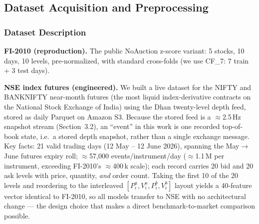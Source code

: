 \documentclass[11pt]{article}
\begin{document}
\subsection{Dataset Acquisition and Preprocessing}

\subsubsection{Dataset Description}
\textbf{FI-2010 (reproduction).} The public NoAuction z-score variant: 5 stocks, 10 days, 10 levels,
pre-normalized, with standard cross-folds (we use CF\_7: 7 train + 3 test days).

\textbf{NSE index futures (engineered).} We built a live dataset for the NIFTY and BANKNIFTY near-month
futures (the most liquid index-derivative contracts on the National Stock Exchange of India) using the Dhan
twenty-level depth feed, stored as daily Parquet on Amazon S3. Because the stored feed is a $\approx$2.5\,Hz
snapshot stream (Section~3.2), an ``event'' in this work is one recorded top-of-book state, i.e.\ a stored
depth snapshot, rather than a single exchange message. Key facts: 21 valid trading days (12 May -- 12 June
2026), spanning the May$\rightarrow$June futures expiry roll; $\approx$57{,}000 events/instrument/day
($\approx$1.1\,M per instrument, exceeding FI-2010's $\approx$400\,k scale); each record carries 20 bid and
20 ask levels with price, quantity, \emph{and} order count. Taking the first 10 of the 20 levels and
reordering to the interleaved $[P^a_i,V^a_i,P^b_i,V^b_i]$ layout yields a 40-feature vector identical to
FI-2010, so all models transfer to NSE with no architectural change --- the design choice that makes a
direct benchmark-to-market comparison possible.
\end{document}
